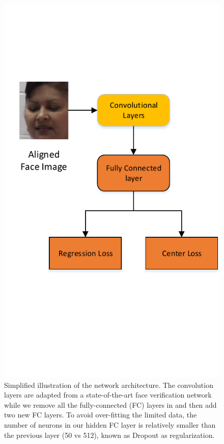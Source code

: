 \documentclass{article}
\begin{document}
\begin{figure}[!t]
    \centering
    \includegraphics[scale=0.75]{figures/network.pdf}
    \caption{Simplified illustration of the network architecture. The convolution layers are adapted from a state-of-the-art face verification network \cite{wen2016discriminative} while we remove all the fully-connected (FC) layers in \cite{wen2016discriminative} and then add two new FC layers. To avoid over-fitting the limited data, the number of neurons in our hidden FC layer is relatively smaller than the previous layer (50 vs 512), known as Dropout\cite{srivastava2014dropout} as regularization.}
    \label{fig:net1}
\end{figure}
\end{document}
